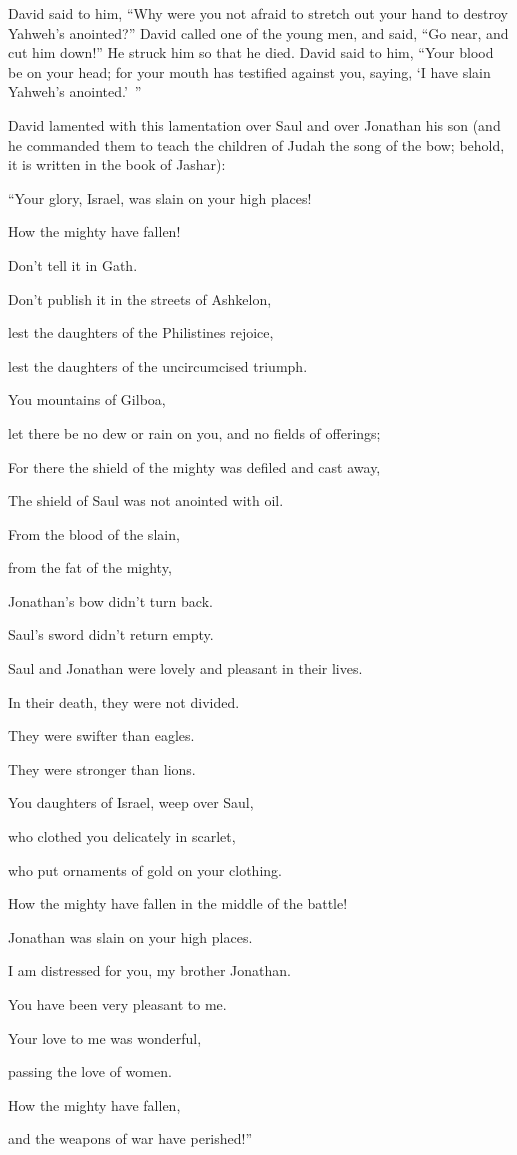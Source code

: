 {\par }{\PP {}David said to him, “Why were you not afraid to stretch out your hand to destroy Yahweh’s anointed?”
David called one of the young men, and said, “Go near, and cut him down!” He struck him so that he died.
David said to him, “Your blood be on your head; for your mouth has testified against you, saying, ‘I have slain Yahweh’s anointed.’ ”
\par }{\PP {}David lamented with this lamentation over Saul and over Jonathan his son
(and he commanded them to teach the children of Judah the song of the bow; behold, it is written in the book of Jashar):
\par }{\Q {}“Your glory, Israel, was slain on your high places!
\par }{\QB How the mighty have fallen!
\par }{\Q {}Don’t tell it in Gath.
\par }{\QB Don’t publish it in the streets of Ashkelon,
\par }{\Q lest the daughters of the Philistines rejoice,
\par }{\QB lest the daughters of the uncircumcised triumph.
\par }{\Q {}You mountains of Gilboa,
\par }{\QB let there be no dew or rain on you, and no fields of offerings;
\par }{\QB For there the shield of the mighty was defiled and cast away,
\par }{\QB The shield of Saul was not anointed with oil.
\par }{\Q {}From the blood of the slain,
\par }{\QB from the fat of the mighty,
\par }{\QB Jonathan’s bow didn’t turn back.
\par }{\QB Saul’s sword didn’t return empty.
\par }{\Q {}Saul and Jonathan were lovely and pleasant in their lives.
\par }{\QB In their death, they were not divided.
\par }{\Q They were swifter than eagles.
\par }{\QB They were stronger than lions.
\par }{\Q {}You daughters of Israel, weep over Saul,
\par }{\QB who clothed you delicately in scarlet,
\par }{\QB who put ornaments of gold on your clothing.
\par }{\Q {}How the mighty have fallen in the middle of the battle!
\par }{\QB Jonathan was slain on your high places.
\par }{\Q {}I am distressed for you, my brother Jonathan.
\par }{\QB You have been very pleasant to me.
\par }{\QB Your love to me was wonderful,
\par }{\QB passing the love of women.
\par }{\Q {}How the mighty have fallen,
\par }{\QB and the weapons of war have perished!”

}
